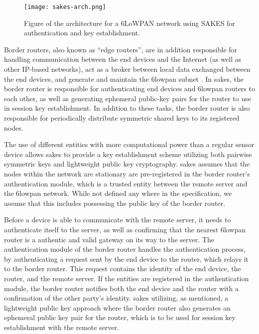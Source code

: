 \begin{figure}[h]
	\centering
	\texttt{[image: sakes-arch.png]}
	\caption{Figure of the architecture for a 6LoWPAN network using SAKES for authentication and key establishment.}
	\label{fig:sakes-arch}
\end{figure}


Border routers, also known as ``edge routers'', are in addition responsible for handling communication between the end devices and the Internet (as well as other IP-based networks), act as a broker between local data exchanged between the end devices, and generate and maintain the \gls{6lowpan} subnet \cite{olsson20146lowpan}. In \gls{sakes}, the border router is responsible for authenticating end devices and \gls{6lowpan} routers to each other, as well as generating ephemeral public-key pairs for the router to use in session key establishment. In addition to these tasks, the border router is also responsible for periodically distribute symmetric shared keys to its registered nodes.

The use of different entities with more computational power than a regular sensor device allows \gls{sakes} to provide a key establishment scheme utilizing both pairwise symmetric keys and lightweight public key cryptography. \gls{sakes} assumes that the nodes within the network are stationary are pre-registered in the border router's authentication module, which is a trusted entity between the remote server and the \gls{6lowpan} network. While not defined any where in the specification, we assume that this includes possessing the public key of the border router. 

Before a device is able to communicate with the remote server, it needs to authenticate itself to the server, as well as confirming that the nearest \gls{6lowpan} router is a authentic and valid gateway on its way to the server. The authentication module of the border router handles the authentication process, by authenticating a request sent by the end device to the router, which relays it to the border router. This request contains the identity of the end device, the router, and the remote server. If the entities are registered in the authentication module, the border router notifies both the end device and the router with a confirmation of the other party's identity. \gls{sakes} utilizing, as mentioned, a lightweight public key approach where the border router also generates an ephemeral public key pair for the router, which is to be used for session key establishment with the remote server.

